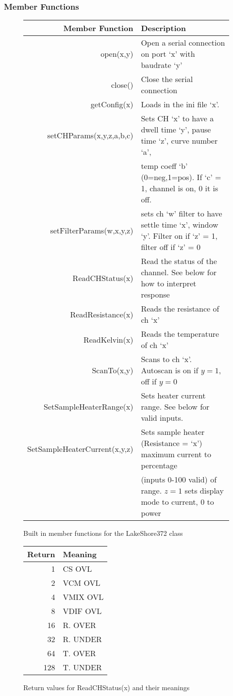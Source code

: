 \documentclass{article}
\begin{document}
\subsubsection{Member Functions}
\begin{figure}[H]
\centering
\begin{tabular}{| r | l | }
Member Function & Description \\ \hline \hline
open(x,y)  & Open a serial connection on port `x' with baudrate `y'\\
close()  & Close the serial connection\\
getConfig(x) & Loads in the ini file `x'. \\
setCHParams(x,y,z,a,b,c) & Sets CH `x' to have a dwell time `y', pause time `z', curve number `a', \\
 & temp coeff `b' (0=neg,1=pos). If `c' = 1, channel is on, 0 it is off.\\
setFilterParams(w,x,y,z) & sets ch `w' filter to have settle time `x', window `y'. Filter on if `z' = 1, filter off if `z' = 0\\
ReadCHStatus(x)  & Read the status of the channel. See below for how to interpret response\\
ReadResistance(x)  & Reads the resistance of ch `x'\\
ReadKelvin(x)  & Reads the temperature of ch `x'\\
ScanTo(x,y)  & Scans to ch `x'. Autoscan is on if $y = 1$, off if $y=0$\\
SetSampleHeaterRange(x)  & Sets heater current range. See below for valid inputs. \\
SetSampleHeaterCurrent(x,y,z)  & Sets  sample heater (Resistance = `x')  maximum current to percentage\\
&  (inputs 0-100 valid) of range. $z=1$ sets display mode to current, $0$ to power \\ \hline
\end{tabular}
\caption{Built in member functions for the LakeShore372 class}
\end{figure}

\begin{figure}[H]
\centering
\begin{tabular}{r | l }
Return & Meaning \\ \hline \hline
1 & CS OVL\\
2 & VCM OVL\\
4 & VMIX OVL\\
8 & VDIF OVL\\
16 & R. OVER\\
32 & R. UNDER\\
64 & T. OVER\\
128 & T. UNDER\\
\end{tabular}
\caption{Return values for ReadCHStatus(x) and their meanings}
\end{figure}
\end{document}
